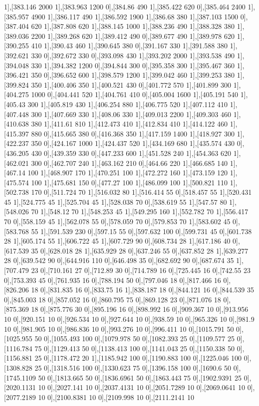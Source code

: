 {1],[383.146 2000 1],[383.963 1200 0],[384.86 490 1],[385.422 620 0],[385.464 2400 1],[385.957 4900 1],[386.117 490 1],[386.592 1900 1],[386.68 380 1],[387.103 1500 0],[387.404 620 1],[387.808 620 1],[388.145 1000 1],[388.236 490 1],[388.328 380 1],[389.036 2200 1],[389.268 620 1],[389.412 490 0],[389.677 490 1],[389.978 620 1],[390.255 410 1],[390.43 460 1],[390.645 380 0],[391.167 330 1],[391.588 380 1],[392.621 330 0],[392.672 330 0],[393.098 430 1],[393.202 2000 1],[393.538 490 1],[394.048 330 1],[394.382 1200 0],[394.844 300 0],[395.358 300 1],[395.467 360 1],[396.421 350 0],[396.652 600 1],[398.579 1200 1],[399.042 460 1],[399.253 380 1],[399.824 350 1],[400.406 350 1],[400.521 430 0],[401.772 570 1],[401.899 300 1],[404.275 1000 0],[404.441 520 1],[404.761 410 0],[405.004 1600 1],[405.191 540 1],[405.43 300 1],[405.819 430 1],[406.254 880 1],[406.775 520 1],[407.112 410 1],[407.448 300 1],[407.669 330 1],[408.06 330 1],[409.013 2200 1],[409.303 460 1],[410.638 380 1],[411.61 810 1],[412.473 410 1],[412.834 410 1],[414.122 460 1],[415.397 880 0],[415.665 380 0],[416.368 350 1],[417.159 1400 1],[418.927 300 1],[422.237 350 0],[424.167 1000 1],[424.437 520 1],[434.169 680 1],[435.574 430 0],[436.205 430 0],[439.359 330 0],[447.233 600 1],[451.528 240 1],[454.363 620 1],[462.021 300 0],[462.707 240 1],[463.162 210 0],[464.66 220 1],[466.685 140 1],[467.14 100 1],[468.907 170 1],[470.251 100 1],[472.272 160 1],[473.159 120 1],[475.574 100 1],[475.681 150 0],[477.27 100 1],[486.099 100 1],[500.821 110 1],[502.738 170 0],[511.724 70 1],[516.032 80 1],[516.414 55 0],[518.457 55 1],[520.431 45 1],[524.775 45 1],[525.704 45 1],[528.038 70 0],[538.619 55 1],[547.57 80 1],[548.026 70 1],[548.12 70 1],[548.253 45 1],[549.295 160 1],[552.782 70 1],[556.417 70 0],[558.159 45 1],[562.078 55 0],[578.059 70 0],[579.853 70 1],[583.602 45 0],[583.768 55 1],[591.539 230 0],[597.15 55 0],[597.632 100 0],[599.731 45 0],[601.738 28 1],[605.174 55 1],[606.722 45 1],[607.729 90 0],[608.734 28 1],[617.186 40 0],[617.539 35 0],[628.018 28 1],[635.929 28 0],[637.246 55 0],[637.852 28 1],[639.277 28 0],[639.542 90 0],[644.916 110 0],[646.498 35 0],[682.692 90 0],[687.674 35 1],[707.479 23 0],[710.161 27 0],[712.89 30 0],[714.789 16 0],[725.445 16 0],[742.55 23 0],[753.393 45 0],[761.935 16 0],[788.194 50 0],[797.046 18 0],[817.466 16 0],[826.206 18 0],[831.835 16 0],[833.75 16 1],[838.187 18 0],[844.121 16 0],[844.539 35 0],[845.003 18 0],[857.052 16 0],[860.795 75 0],[869.128 23 0],[871.076 18 0],[875.369 18 0],[875.776 30 0],[895.196 16 0],[898.992 16 0],[909.367 10 0],[913.956 10 0],[920.151 10 0],[926.534 10 0],[927.644 10 0],[938.59 10 0],[965.326 10 0],[981.9 10 0],[981.905 10 0],[986.836 10 0],[993.276 10 0],[996.411 10 0],[1015.791 50 0],[1025.955 50 0],[1055.493 100 0],[1079.978 50 0],[1082.393 25 0],[1109.577 25 0],[1116.784 75 0],[1129.413 50 0],[1138.413 100 0],[1141.043 25 0],[1150.338 50 0],[1156.881 25 0],[1178.472 20 1],[1185.942 100 0],[1190.883 100 0],[1225.046 100 0],[1308.828 25 0],[1318.516 100 0],[1330.623 75 0],[1396.158 100 0],[1690.6 50 0],[1745.1109 50 0],[1813.665 50 0],[1836.6961 50 0],[1863.443 75 0],[1902.9391 25 0],[2020.1131 10 0],[2027.141 10 0],[2037.4131 10 0],[2051.7289 10 0],[2069.0641 10 0],[2077.2189 10 0],[2100.8381 10 0],[2109.998 10 0],[2111.2141 10 }
